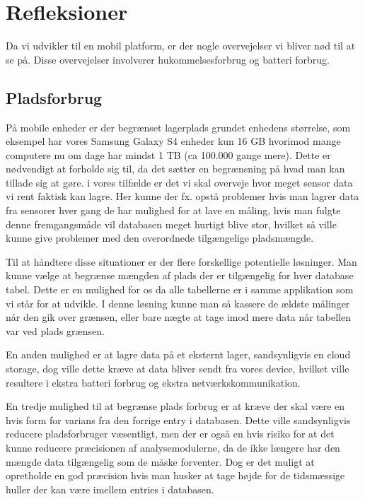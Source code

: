 \section{Refleksioner}
Da vi udvikler til en mobil platform, er der nogle overvejelser vi bliver nød til at se på.
Disse overvejelser involverer hukommelsesforbrug og batteri forbrug.

\subsection{Pladsforbrug}
På mobile enheder er der begrænset lagerplads grundet enhedens størrelse, som eksempel har vores Samsung Galaxy S4 enheder kun 16 GB hvorimod mange computere nu om dage har mindst 1 TB (ca 100.000 gange mere).
Dette er nødvendigt at forholde sig til, da det sætter en begrænsning på hvad man kan tillade sig at gøre.
i vores tilfælde er det vi skal overveje hvor meget sensor data vi rent faktisk kan lagre.
Her kunne der fx. opstå problemer hvis man lagrer data fra sensorer hver gang de har mulighed for at lave en måling, hvis man fulgte denne fremgangsmåde vil databasen meget hurtigt blive stor, hvilket så ville kunne give problemer med den overordnede tilgængelige pladsmængde.

Til at håndtere disse situationer er der flere forskellige potentielle løsninger.
Man kunne vælge at begrænse mængden af plads der er tilgængelig for hver database tabel.
Dette er en mulighed for os da alle tabellerne er i samme applikation som vi står for at udvikle.
I denne løsning kunne man så kassere de ældste målinger når den gik over grænsen, eller bare nægte at tage imod mere data når tabellen var ved plads grænsen.

En anden mulighed er at lagre data på et eksternt lager, sandsynligvis en cloud storage, dog ville dette kræve at data bliver sendt fra vores device, hvilket ville resultere i ekstra batteri forbrug og ekstra netværkskommunikation.

En tredje mulighed til at begrænse plads forbrug er at kræve der skal være en hvis form for varians fra den forrige entry i databasen. Dette ville sandsynligvis reducere pladsforbruger væsentligt, men der er også en hvis risiko for at det kunne reducere præcisionen af analysemodulerne, da de ikke længere har den mængde data tilgængelig som de måske forventer.
Dog er det muligt at opretholde en god præcision hvis man husker at tage højde for de tidsmæssige huller der kan være imellem entries i databasen.

